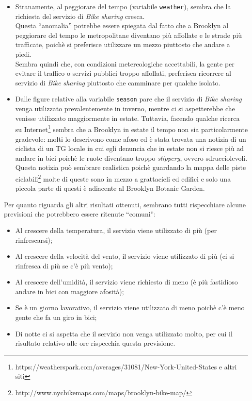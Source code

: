 \begin{itemize}
\item Stranamente, al peggiorare del tempo (variabile \texttt{weather}),
  sembra che la richiesta del servizio di \emph{Bike sharing} cresca. \\
  Questa ``anomalia'' potrebbe essere spiegata dal fatto che a Brooklyn al
  peggiorare del tempo le metropolitane diventano più affollate e le strade
  più trafficate, poichè si preferisce utilizzare un mezzo piuttosto che
  andare a piedi. \\
  Sembra quindi che, con condizioni metereologiche accettabili, la gente per
  evitare il traffico o servizi pubblici troppo affollati, preferisca
  ricorrere al servizio di \emph{Bike sharing} piuttosto che camminare per
  qualche isolato.
\item Dalle figure relative alla variabile \texttt{season} pare che il
  servizio di \emph{Bike sharing} venga utilizzato prevalentemente in inverno,
  mentre ci si aspetterebbe che venisse utilizzato maggiormente in estate.
  Tuttavia, facendo qualche ricerca su Internet\footnote{
  https://weatherspark.com/averages/31081/New-York-United-States e altri siti}
  sembra che a Brooklyn in estate il tempo non sia particolarmente gradevole:
  molti lo descrivono come afoso ed è stata trovata una notizia di un ciclista
  di un TG locale in cui egli denuncia che in estate non si riesce più ad
  andare in bici poichè le ruote diventano troppo \emph{slippery}, ovvero
  sdrucciolevoli. \\
  Questa notizia può sembrare realistica poichè guardando la mappa delle piste
  ciclabili\footnote{http://www.nycbikemaps.com/maps/brooklyn-bike-map/} molte
  di queste sono in mezzo a grattacieli ed edifici e solo una piccola parte di
  questi è adiacente al Brooklyn Botanic Garden.
\end{itemize}

Per quanto riguarda gli altri risultati ottenuti, sembrano tutti rispecchiare
alcune previsioni che potrebbero essere ritenute ``comuni'':

\begin{itemize}
\item Al crescere della temperatura, il servizio viene utilizzato di più (per
  rinfrescarsi);
\item Al crescere della velocità del vento, il servizio viene utilizzato di
  più (ci si rinfresca di più se c'è più vento);
\item Al crescere dell'umidità, il servizio viene richiesto di meno (è più
  fastidioso andare in bici con maggiore afosità);
\item Se è un giorno lavorativo, il servizio viene utilizzato di meno poichè
  c'è meno gente che fa un giro in bici;
\item Di notte ci si aspetta che il servizio non venga utilizzato molto, per
  cui il risultato relativo alle ore rispecchia questa previsione.
\end{itemize}

